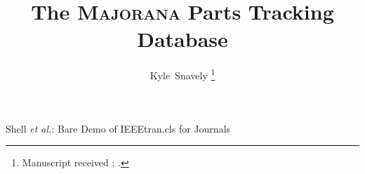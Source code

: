 \documentclass[journal]{IEEEtran}
\begin{document}
%
\title{The \textsc{Majorana} Parts Tracking Database}
%
%
%

\author{Kyle~Snavely
\thanks{Manuscript received ; .}}

% 
%



%
{Shell \MakeLowercase{\textit{et al.}}: Bare Demo of IEEEtran.cls for Journals}
% 




\end{document}
